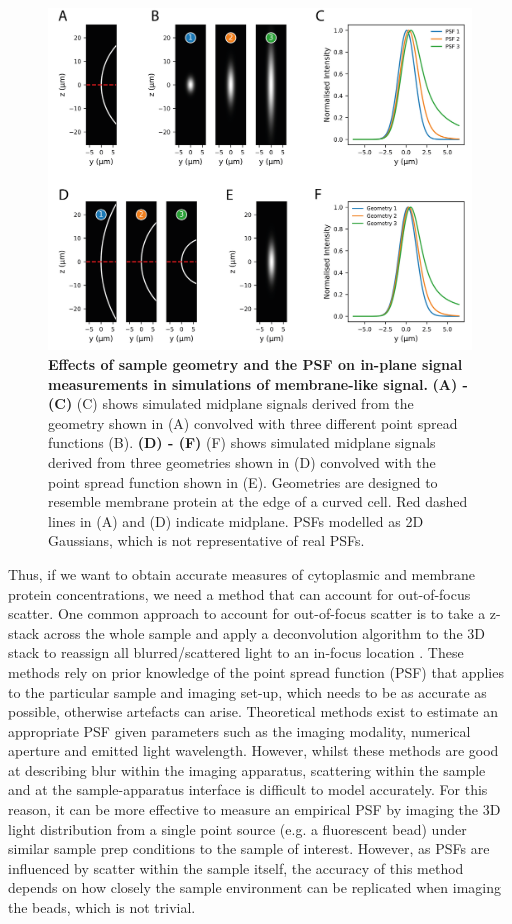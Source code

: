 \documentclass[12pt]{"article"}
\newcommand{\mycaption}[2]{\caption[#1]{\textbf{#1.} #2}}
\begin{document}
\begin{figure}
\includegraphics[scale=0.9]{memquant_mem_psf}
\centering
\mycaption{Effects of sample geometry and the PSF on in-plane signal measurements in simulations of membrane-like signal}{
\textbf{(A) - (C)} (C) shows simulated midplane signals derived from the geometry shown in (A) convolved with three different point spread functions (B).
\textbf{(D) - (F)} (F) shows simulated midplane signals derived from three geometries shown in (D) convolved with the point spread function shown in (E). Geometries are designed to resemble membrane protein at the edge of a curved cell. Red dashed lines in (A) and (D) indicate midplane. PSFs modelled as 2D Gaussians, which is not representative of real PSFs.
}
\label{fig:memquant_mem_psf}
\end{figure}

Thus, if we want to obtain accurate measures of cytoplasmic and membrane protein concentrations, we need a method that can account for out-of-focus scatter. One common approach to account for out-of-focus scatter is to take a z-stack across the whole sample and apply a deconvolution algorithm to the 3D stack to reassign all blurred/scattered light to an in-focus location \citep{Wallace2001}. These methods rely on prior knowledge of the point spread function (PSF) that applies to the particular sample and imaging set-up, which needs to be as accurate as possible, otherwise artefacts can arise. Theoretical methods exist to estimate an appropriate PSF given parameters such as the imaging modality, numerical aperture and emitted light wavelength. However, whilst these methods are good at describing blur within the imaging apparatus, scattering within the sample and at the sample-apparatus interface is difficult to model accurately. For this reason, it can be more effective to measure an empirical PSF by imaging the 3D light distribution from a single point source (e.g. a fluorescent bead) under similar sample prep conditions to the sample of interest. However, as PSFs are influenced by scatter within the sample itself, the accuracy of this method depends on how closely the sample environment can be replicated when imaging the beads, which is not trivial. \\
\end{document}
